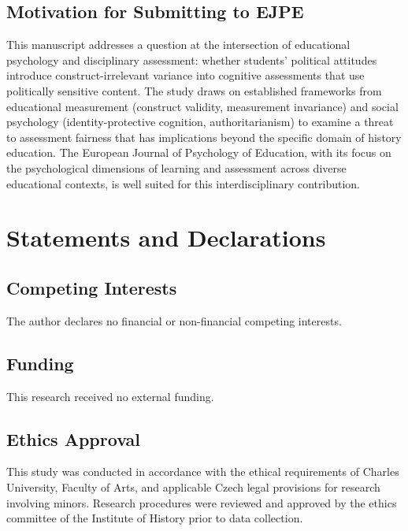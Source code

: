 \documentclass[pdflatex,sn-apa]{sn-jnl}%
\begin{document}
\subsection*{Motivation for Submitting to EJPE}

This manuscript addresses a question at the intersection of educational psychology and disciplinary assessment: whether students' political attitudes introduce construct-irrelevant variance into cognitive assessments that use politically sensitive content. The study draws on established frameworks from educational measurement (construct validity, measurement invariance) and social psychology (identity-protective cognition, authoritarianism) to examine a threat to assessment fairness that has implications beyond the specific domain of history education. The European Journal of Psychology of Education, with its focus on the psychological dimensions of learning and assessment across diverse educational contexts, is well suited for this interdisciplinary contribution.


\section*{Statements and Declarations}

\subsection*{Competing Interests}

The author declares no financial or non-financial competing interests.

\subsection*{Funding}

This research received no external funding.

\subsection*{Ethics Approval}

This study was conducted in accordance with the ethical requirements of Charles University, Faculty of Arts, and applicable Czech legal provisions for research involving minors. Research procedures were reviewed and approved by the ethics committee of the Institute of History prior to data collection.
\end{document}
